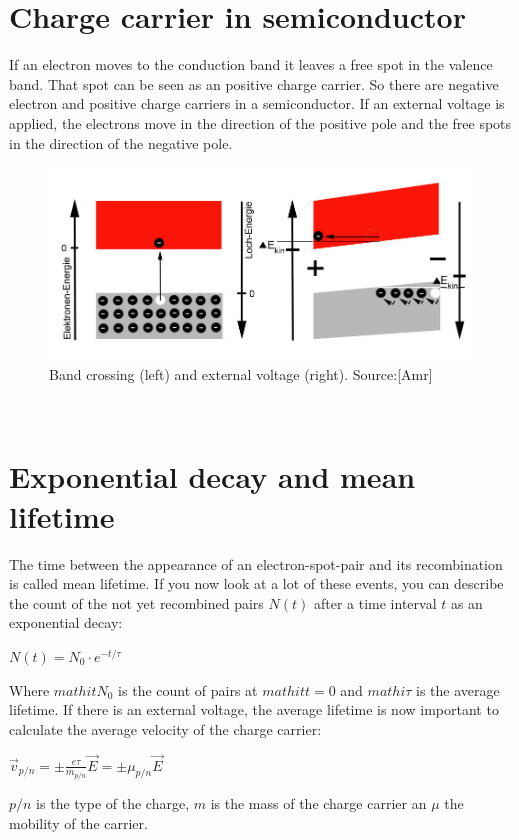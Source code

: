 \section{Charge carrier in semiconductor}
If an electron moves to the conduction band it leaves a free spot in the valence band. That spot can be seen as an positive charge carrier. So there are negative electron and positive charge carriers in a semiconductor. If an external voltage is applied, the electrons move in the direction of the positive pole and the free spots in the direction of the negative pole.
\begin{figure}[h]
\begin{center}
\includegraphics[scale=0.3]{bilder/ladungstraeger}
\caption{Band crossing (left) and external voltage (right). Source:[Amr] }
\label{fig:ladungs}
\end{center}
\end{figure}
\\
\section{Exponential decay and mean lifetime}
The time between the appearance of an electron-spot-pair and its recombination is called mean lifetime. If you now look at a lot of these events, you can describe the count of the not yet recombined pairs $\mathit{N(t)}$ after a time interval $\mathit{t}$ as an exponential decay:
\begin{center}
$\mathit{N(t)=N_{0}\cdot e^{-t/\tau}}$
\end{center}
Where $mathit{N_{0}}$ is the count of pairs at $mathit{t=0}$ and $mathi{\tau}$ is the average lifetime. If there is an external voltage, the average lifetime is now important to calculate the average velocity of the charge carrier:
\begin{center}
$\mathit{\vec{v}_{p/n}=\pm\frac{e\tau}{m_{p/n}}\vec{E}=\pm\mu_{p/n}\vec{E}}$
\end{center}
$\mathit{p/n}$ is the type of the charge, $\mathit{m}$ is the mass of the charge carrier an $\mathit{\mu}$ the mobility of the carrier.

